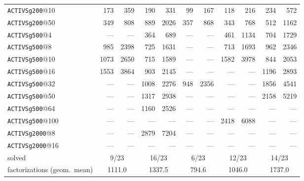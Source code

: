 \begin{table}[tbp]
\begin{tabular}{lrrrrrrrrrr}
\texttt{ACTIVSg200}@10 & 173 & 359 & 190 & 331 & 99 & 167 & 118 & 216 & 234 & 572 \\
\texttt{ACTIVSg200}@50 & 349 & 808 & 889 & 2026 & 357 & 868 & 343 & 768 & 512 & 1162 \\
\texttt{ACTIVSg500}@4 & --- & --- & 364 & 689 & --- & --- & 461 & 1134 & 704 & 1729 \\
\texttt{ACTIVSg500}@8 & 985 & 2398 & 725 & 1631 & --- & --- & 713 & 1693 & 962 & 2346 \\
\texttt{ACTIVSg500}@10 & 1073 & 2650 & 715 & 1589 & --- & --- & 1582 & 3978 & 844 & 2053 \\
\texttt{ACTIVSg500}@16 & 1553 & 3864 & 903 & 2145 & --- & --- & --- & --- & 1196 & 2893 \\
\texttt{ACTIVSg500}@32 & --- & --- & 1008 & 2276 & 948 & 2356 & --- & --- & 1856 & 4541 \\
\texttt{ACTIVSg500}@50 & --- & --- & 1317 & 2938 & --- & --- & --- & --- & 2158 & 5219 \\
\texttt{ACTIVSg500}@64 & --- & --- & 1160 & 2526 & --- & --- & --- & --- & --- & --- \\
\texttt{ACTIVSg500}@100 & --- & --- & --- & --- & --- & --- & 2418 & 6088 & --- & --- \\
\texttt{ACTIVSg2000}@8 & --- & --- & 2879 & 7204 & --- & --- & --- & --- & --- & --- \\
\texttt{ACTIVSg2000}@16 & --- & --- & --- & --- & --- & --- & --- & --- & --- & --- \\
\midrule solved & \multicolumn{2}{c}{9/23} & \multicolumn{2}{c}{16/23} & \multicolumn{2}{c}{6/23} & \multicolumn{2}{c}{12/23} & \multicolumn{2}{c}{14/23} \\
factorizations (geom.\ mean) & \multicolumn{2}{c}{1111.0} & \multicolumn{2}{c}{1337.5} & \multicolumn{2}{c}{794.6} & \multicolumn{2}{c}{1046.0} & \multicolumn{2}{c}{1737.0} \\
\bottomrule\end{tabular}\end{table}
